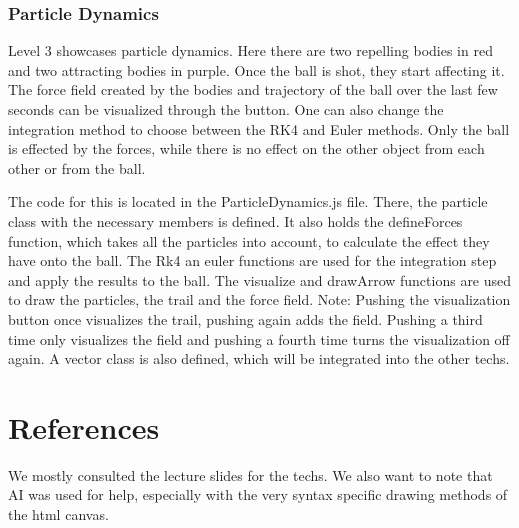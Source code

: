 \documentclass{article}
\begin{document}
\subsubsection{Particle Dynamics}
Level 3 showcases particle dynamics. Here there are two repelling bodies in red and two attracting bodies in purple. Once the ball is shot, they start affecting it. The force field created by the bodies and trajectory of the ball over the last few seconds can be visualized through the button. One can also change the integration method to choose between the RK4 and Euler methods. Only the ball is effected by the forces, while there is no effect on the other object from each other or from the ball.  \newline

The code for this is located in the ParticleDynamics.js file. There, the particle class with the necessary members is defined. It also holds the defineForces function, which takes all the particles into account, to calculate the effect they have onto the ball. The Rk4 an euler functions are used for the integration step and apply the results to the ball. The visualize and drawArrow functions are used to draw the particles, the trail and the force field. 
Note: Pushing the visualization button once visualizes the trail, pushing again adds the field. Pushing a third time only visualizes the field and pushing a fourth time turns the visualization off again. 
A vector class is also defined, which will be integrated into the other techs. 

\section{References}

We mostly consulted the lecture slides for the techs. We also want to note that AI was 
used for help, especially with the very syntax specific drawing methods of the html canvas.
\end{document}
